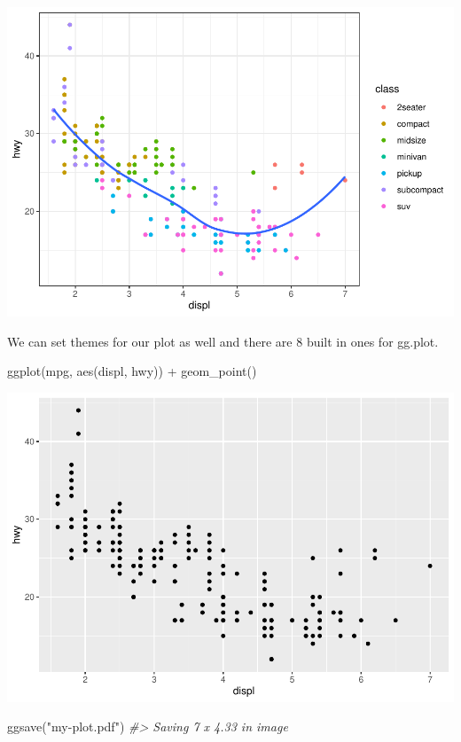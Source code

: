 \documentclass[
]{article}
\newenvironment{Shaded}{\begin{snugshade}}{\end{snugshade}}
\newcommand{\CommentTok}[1]{\textcolor[rgb]{0.56,0.35,0.01}{\textit{#1}}}
\newcommand{\FunctionTok}[1]{\textcolor[rgb]{0.00,0.00,0.00}{#1}}
\newcommand{\NormalTok}[1]{#1}
\newcommand{\SpecialCharTok}[1]{\textcolor[rgb]{0.00,0.00,0.00}{#1}}
\newcommand{\StringTok}[1]{\textcolor[rgb]{0.31,0.60,0.02}{#1}}
\begin{document}
\includegraphics{Journal_files/figure-latex/unnamed-chunk-68-1.pdf}

We can set themes for our plot as well and there are 8 built in ones for
gg.plot.

\begin{Shaded}
\begin{Highlighting}[]
\FunctionTok{ggplot}\NormalTok{(mpg, }\FunctionTok{aes}\NormalTok{(displ, hwy)) }\SpecialCharTok{+} \FunctionTok{geom\_point}\NormalTok{()}
\end{Highlighting}
\end{Shaded}

\includegraphics{Journal_files/figure-latex/unnamed-chunk-69-1.pdf}

\begin{Shaded}
\begin{Highlighting}[]
\FunctionTok{ggsave}\NormalTok{(}\StringTok{"my{-}plot.pdf"}\NormalTok{)}
\CommentTok{\#\textgreater{} Saving 7 x 4.33 in image}
\end{Highlighting}
\end{Shaded}
\end{document}
